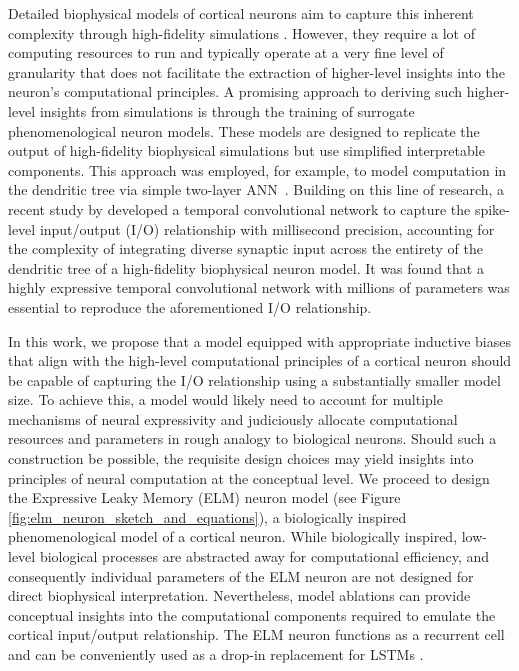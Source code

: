 \documentclass{article} \usepackage{iclr2024_doc_style,times}
\begin{document}
Detailed biophysical models of cortical neurons aim to capture this inherent complexity through high-fidelity simulations \cite{hay2011models,herz2006modeling,almog2016realistic}. However, they require a lot of computing resources to run and typically operate at a very fine level of granularity that does not facilitate the extraction of higher-level insights into the neuron's computational principles. A promising approach to deriving such higher-level insights from simulations is through the training of surrogate phenomenological neuron models. These models are designed to replicate the output of high-fidelity biophysical simulations but use simplified interpretable components. This approach was employed, for example, to model computation in the dendritic tree via simple two-layer ANN~\cite{poirazi2003pyramidal,tzilivaki2019challenging,ujfalussy2018global}. Building on this line of research, a recent study by \citet{beniaguev2021single} developed a temporal convolutional network to capture the spike-level input/output (I/O) relationship with millisecond precision, accounting for the complexity of integrating diverse synaptic input across the entirety of the dendritic tree of a high-fidelity biophysical neuron model. It was found that a highly expressive temporal convolutional network with millions of parameters was essential to reproduce the aforementioned I/O relationship.



In this work, we propose that a model equipped with appropriate inductive biases that align with the high-level computational principles of a cortical neuron should be capable of capturing the I/O relationship using a substantially smaller model size. To achieve this, a model would likely need to account for multiple mechanisms of neural expressivity and judiciously allocate computational resources and parameters in rough analogy to biological neurons. Should such a construction be possible, the requisite design choices may yield insights into principles of neural computation at the conceptual level. We proceed to design the Expressive Leaky Memory (ELM) neuron model (see Figure \ref{fig:elm_neuron_sketch_and_equations}), a biologically inspired phenomenological model of a cortical neuron. While biologically inspired, low-level biological processes are abstracted away for computational efficiency, and consequently individual parameters of the ELM neuron are not designed for direct biophysical interpretation. Nevertheless, model ablations can provide conceptual insights into the computational components required to emulate the cortical input/output relationship. The ELM neuron functions as a recurrent cell and can be conveniently used as a drop-in replacement for LSTMs \cite{hochreiter1997long}. 
\end{document}

